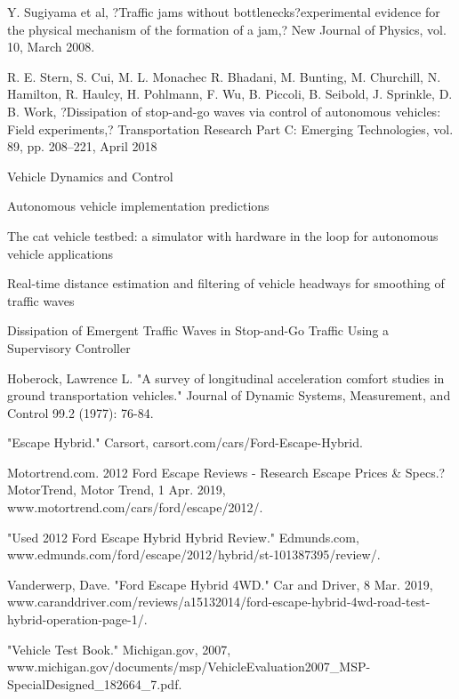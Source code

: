 \documentclass[conference]{IEEEtran}
\begin{document}
\begin{thebibliography}{00}
 Y. Sugiyama et al, ?Traffic jams without bottlenecks?experimental evidence for the physical mechanism of the formation of a jam,? New Journal of Physics, vol. 10, March 2008.

 R. E. Stern, S. Cui, M. L. Monachec R. Bhadani, M. Bunting, M. Churchill, N. Hamilton, R. Haulcy, H. Pohlmann, F. Wu, B. Piccoli, B. Seibold, J. Sprinkle, D. B. Work, ?Dissipation of stop-and-go waves via control of autonomous vehicles: Field experiments,? Transportation Research Part C: Emerging Technologies, vol. 89, pp. 208--221, April 2018

 Vehicle Dynamics and Control

 Autonomous vehicle implementation predictions

 The cat vehicle testbed: a simulator with hardware in the loop for autonomous vehicle applications

 Real-time distance estimation and filtering of vehicle headways for smoothing of traffic waves

 Dissipation of Emergent Traffic Waves in Stop-and-Go Traffic Using a Supervisory Controller

 Hoberock, Lawrence L. "A survey of longitudinal acceleration comfort studies in ground transportation vehicles." Journal of Dynamic Systems, Measurement, and Control 99.2 (1977): 76-84. 

"Escape Hybrid." Carsort, carsort.com/cars/Ford-Escape-Hybrid.

Motortrend.com. 2012 Ford Escape Reviews - Research Escape Prices \& Specs.? MotorTrend, Motor Trend, 1 Apr. 2019, www.motortrend.com/cars/ford/escape/2012/.

"Used 2012 Ford Escape Hybrid Hybrid Review." Edmunds.com, www.edmunds.com/ford/escape/2012/hybrid/st-101387395/review/.

Vanderwerp, Dave. "Ford Escape Hybrid 4WD." Car and Driver, 8 Mar. 2019, www.caranddriver.com/reviews/a15132014/ford-escape-hybrid-4wd-road-test-hybrid-operation-page-1/.

"Vehicle Test Book." Michigan.gov, 2007, www.michigan.gov/documents/msp/VehicleEvaluation2007_MSP-SpecialDesigned_182664_7.pdf.


\end{thebibliography}
\end{document}
